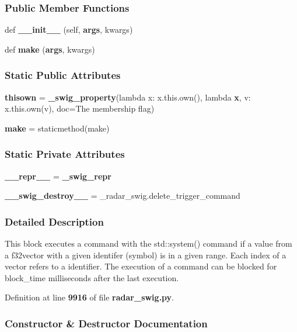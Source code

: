 \subsubsection*{Public Member Functions}
\begin{DoxyCompactItemize}
\item 
def {\bf \+\_\+\+\_\+init\+\_\+\+\_\+} (self, {\bf args}, kwargs)
\item 
def {\bf make} ({\bf args}, kwargs)
\end{DoxyCompactItemize}
\subsubsection*{Static Public Attributes}
\begin{DoxyCompactItemize}
\item 
{\bf thisown} = {\bf \+\_\+swig\+\_\+property}(lambda x\+: x.\+this.\+own(), lambda {\bf x}, v\+: x.\+this.\+own(v), doc=\textquotesingle{}The membership flag\textquotesingle{})
\item 
{\bf make} = staticmethod(make)
\end{DoxyCompactItemize}
\subsubsection*{Static Private Attributes}
\begin{DoxyCompactItemize}
\item 
{\bf \+\_\+\+\_\+repr\+\_\+\+\_\+} = {\bf \+\_\+swig\+\_\+repr}
\item 
{\bf \+\_\+\+\_\+swig\+\_\+destroy\+\_\+\+\_\+} = \+\_\+radar\+\_\+swig.\+delete\+\_\+trigger\+\_\+command
\end{DoxyCompactItemize}


\subsubsection{Detailed Description}
\begin{DoxyVerb}This block executes a command with the std::system() command if a value from a f32vector with a given identifer (symbol) is in a given range. Each index of a vector refers to a identifier. The execution of a command can be blocked for block_time milliseconds after the last execution.\end{DoxyVerb}
 

Definition at line {\bf 9916} of file {\bf radar\+\_\+swig.\+py}.



\subsubsection{Constructor \& Destructor Documentation}
